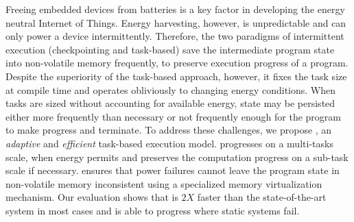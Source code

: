 %
Freeing embedded devices from batteries is a key factor in developing the energy neutral Internet of Things. 
Energy harvesting, however, is unpredictable and can only power a device intermittently. Therefore, the two paradigms of intermittent execution (checkpointing and task-based) save the intermediate program state into non-volatile memory frequently, to preserve execution progress of a program. Despite the superiority of the task-based approach, however, it fixes the task size at compile time and operates obliviously to changing energy conditions. When tasks are sized without accounting for available energy, state may be persisted either more frequently than necessary or not frequently enough for the program to make progress and terminate.%
To address these challenges, we propose \sys, an \emph{adaptive} and \emph{efficient} task-based execution model. \sys progresses on a multi-tasks scale, when energy permits and preserves the computation progress on a sub-task scale if necessary. \sys ensures that power failures cannot leave the program state in non-volatile memory inconsistent using a specialized memory virtualization mechanism. Our evaluation shows that \sys is $2X$ faster than the state-of-the-art system in most cases and is able to progress where static systems fail. 
